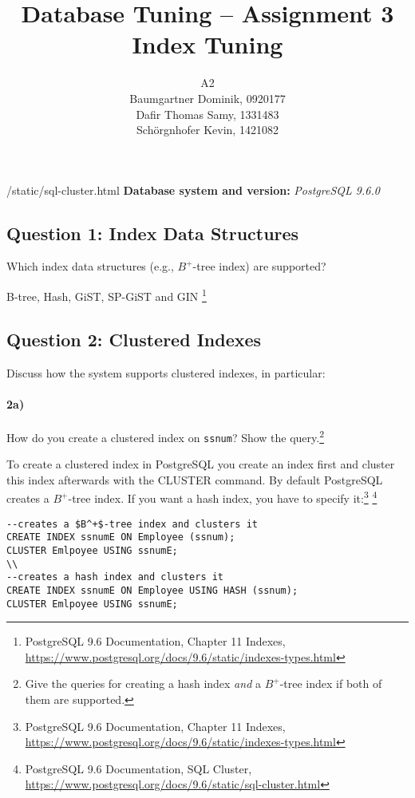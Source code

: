 \documentclass[11pt]{scrartcl}
\title{
  \textbf{\large Database Tuning -- Assignment 3}\\
  Index Tuning
}
\author{
 A2\\
\large Baumgartner Dominik, 0920177 \\
\large Dafir Thomas Samy, 1331483 \\
\large Sch\"orgnhofer Kevin, 1421082
}
\begin{document}
\maketitle

/static/sql-cluster.html
\noindent\textbf{Database system and version:} {\it PostgreSQL 9.6.0}

\subsection*{Question 1: Index Data Structures} Which index data structures (e.g., $B^+$-tree
index) are supported?

\smallskip

B-tree, Hash, GiST, SP-GiST and GIN
\footnote{PostgreSQL 9.6
  Documentation, Chapter 11 Indexes,
  \url{https://www.postgresql.org/docs/9.6/static/indexes-types.html}}


\subsection*{Question 2: Clustered Indexes} Discuss how the system
supports clustered indexes, in particular:

\paragraph{2a)} How do you create a clustered index on {\tt ssnum}?
Show the query.\footnote{Give the queries for creating a hash index
  \emph{and} a $B^+$-tree index if both of them are supported.}

\smallskip

To create a clustered index in PostgreSQL you create an index first and cluster this index afterwards with the CLUSTER command. By default PostgreSQL creates a $B^+$-tree index. If you want a hash index, you have to specify it:\footnote{PostgreSQL 9.6
  Documentation, Chapter 11 Indexes,
  \url{https://www.postgresql.org/docs/9.6/static/indexes-types.html}}
\footnote{PostgreSQL 9.6
  Documentation, SQL Cluster,
  \url{https://www.postgresql.org/docs/9.6/static/sql-cluster.html}}

{\small
\begin{verbatim}
--creates a $B^+$-tree index and clusters it
CREATE INDEX ssnumE ON Employee (ssnum);
CLUSTER Emlpoyee USING ssnumE;
\\
--creates a hash index and clusters it
CREATE INDEX ssnumE ON Employee USING HASH (ssnum);
CLUSTER Emlpoyee USING ssnumE;
\end{verbatim}
}
\end{document}
